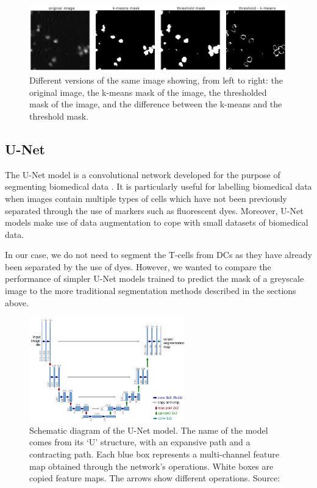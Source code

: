 \begin{figure}[h]
    \centering
    \includegraphics[width=\textwidth]{dissertation/figures/mask_difference.png}
    \caption{Different versions of the same image showing, from left to right: the original image, the k-means mask of the image, the thresholded mask of the image, and the difference between the k-means and the threshold mask.}
    \label{fig:maskdiff}
\end{figure}

\subsection{U-Net}

The U-Net model is a convolutional network developed for the purpose of segmenting biomedical data \citep{ronneberger_unet_2015}. It is particularly useful for labelling biomedical data when images contain multiple types of cells which have not been previously separated through the use of markers such as fluorescent dyes. Moreover, U-Net models make use of data augmentation to cope with small datasets of biomedical data.

In our case, we do not need to segment the T-cells from DCs as they have already been separated by the use of dyes. However, we wanted to compare the performance of simpler U-Net models trained to predict the mask of a greyscale image to the more traditional segmentation methods described in the sections above.

\begin{figure}[h!]
    \centering
    \includegraphics[width=0.6\textwidth]{dissertation/figures/unet_model.png}
    \caption{Schematic diagram of the U-Net model. The name of the model comes from its `U' structure, with an expansive path and a contracting path. Each blue box represents a multi-channel feature map obtained through the network's operations. White boxes are copied feature maps. The arrows show different operations. Source: \citet{ronneberger_unet_2015}}
    \label{fig:unet}
\end{figure}

